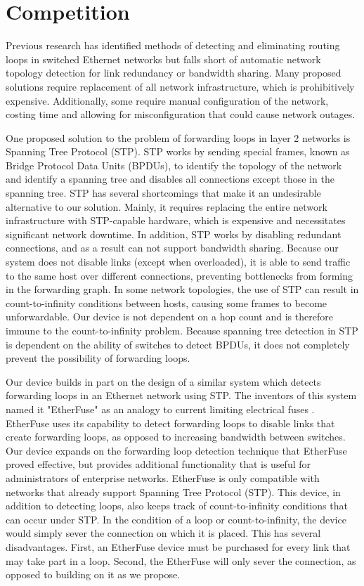 \documentclass{article}
\begin{document}
\section{Competition}
	Previous research has identified methods of detecting and eliminating routing loops in switched Ethernet networks but falls short of automatic network topology detection for link redundancy or bandwidth sharing.
	Many proposed solutions require replacement of all network infrastructure, which is prohibitively expensive.
	Additionally, some require manual configuration of the network, costing time and allowing for misconfiguration that could cause network outages.
	
	One proposed solution to the problem of forwarding loops in layer 2 networks is Spanning Tree Protocol (STP).
	STP works by sending special frames, known as Bridge Protocol Data Units (BPDUs), to identify the topology of the network and identify a spanning tree and disables all connections except those in the spanning tree.
	STP has several shortcomings that make it an undesirable alternative to our solution.
	Mainly, it requires replacing the entire network infrastructure with STP-capable hardware, which is expensive and necessitates significant network downtime.
	In addition, STP works by disabling redundant connections, and as a result can not support bandwidth sharing.
	Because our system does not disable links (except when overloaded), it is able to send traffic to the same host over different connections, preventing bottlenecks from forming in the forwarding graph.
  In some network topologies, the use of STP can result in count-to-infinity conditions between hosts, causing some frames to become unforwardable.
  Our device is not dependent on a hop count and is therefore immune to the count-to-infinity problem.
	Because spanning tree detection in STP is dependent on the ability of switches to detect BPDUs, it does not completely prevent the possibility of forwarding loops.
	
	Our device builds in part on the design of a similar system which detects forwarding loops in an Ethernet network using STP.
	The inventors of this system named it "EtherFuse" as an analogy to current limiting electrical fuses \cite{etherfuse}.
	EtherFuse uses its capability to detect forwarding loops to disable links that create forwarding loops, as opposed to increasing bandwidth between switches.
	Our device expands on the forwarding loop detection technique that EtherFuse proved effective, but provides additional functionality that is useful for administrators of enterprise networks.
	EtherFuse is only compatible with networks that already support Spanning Tree Protocol (STP).
	This device, in addition to detecting loops, also keeps track of count-to-infinity conditions that can occur under STP.
	In the condition of a loop or count-to-infinity, the device would simply sever the connection on which it is placed.
	This has several disadvantages.
	First, an EtherFuse device must be purchased for every link that may take part in a loop.
	Second, the EtherFuse will only sever the connection, as opposed to building on it as we propose.
	
\end{document}
